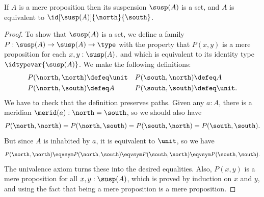 %
\begin{lem}\label{prop:trunc_of_prop_is_set}
If $A$ is a mere proposition then its suspension $\susp(A)$ is a set,
and $A$ is equivalent to $\id[\susp(A)]{\north}{\south}$.
\end{lem}

\begin{proof}
To show that $\susp(A)$ is a set, we define a
family $P:\susp(A)\to\susp(A)\to\type$ with the
property that $P(x,y)$ is a mere proposition for each $x,y:\susp(A)$,
and which is equivalent to its identity type $\idtypevar{\susp(A)}$.
%
We make the following definitions:
\begin{align*}
P(\north,\north) & \defeq \unit &
P(\south,\north) & \defeq A\\
P(\north,\south) & \defeq A &
P(\south,\south) & \defeq \unit.
\end{align*}
We have to check that the definition preserves paths.
Given any $a : A$, there is a meridian $\merid(a) : \north = \south$,
so we should also have
%
\begin{equation*}
  P(\north, \north) = P(\north, \south) = P(\south, \north) = P(\south, \south).
\end{equation*}
%
But since $A$ is inhabited by $a$, it is equivalent to $\unit$, so we have
%
\begin{equation*}
  P(\north, \north) \eqvsym P(\north, \south) \eqvsym P(\south, \north) \eqvsym P(\south, \south).
\end{equation*}
%
The univalence axiom turns these into the desired equalities. Also, $P(x,y)$ is a mere
proposition for all $x, y : \susp(A)$, which is proved by induction on $x$ and $y$, and
using the fact that being a mere proposition is a mere proposition.


\end{proof}
